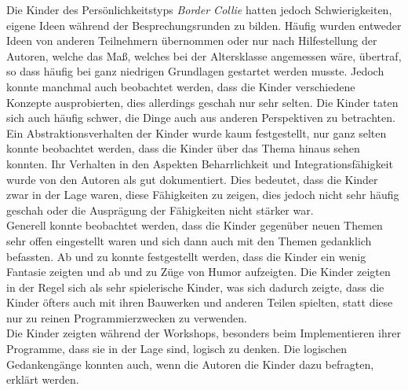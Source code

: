 Die Kinder des Persönlichkeitstyps \textit{Border Collie} hatten jedoch Schwierigkeiten, eigene Ideen während der Besprechungsrunden zu bilden. Häufig wurden entweder Ideen von anderen Teilnehmern übernommen oder nur nach Hilfestellung der Autoren, welche das Maß, welches bei der Altersklasse angemessen wäre, übertraf, so dass häufig bei ganz niedrigen Grundlagen gestartet werden musste. Jedoch konnte manchmal auch beobachtet werden, dass die Kinder verschiedene Konzepte ausprobierten, dies allerdings geschah nur sehr selten. Die Kinder taten sich auch häufig schwer, die Dinge auch aus anderen Perspektiven zu betrachten.\\
Ein Abstraktionsverhalten der Kinder wurde kaum festgestellt, nur ganz selten konnte beobachtet werden, dass die Kinder über das Thema hinaus sehen konnten. Ihr Verhalten in den Aspekten Beharrlichkeit und Integrationsfähigkeit wurde von den Autoren als gut dokumentiert. Dies bedeutet, dass die Kinder zwar in der Lage waren, diese Fähigkeiten zu zeigen, dies jedoch nicht sehr häufig geschah oder die Ausprägung der Fähigkeiten nicht stärker war.\\
Generell konnte beobachtet werden, dass die Kinder gegenüber neuen Themen sehr offen eingestellt waren und sich dann auch mit den Themen gedanklich befassten. Ab und zu konnte festgestellt werden, dass die Kinder ein wenig Fantasie zeigten und ab und zu Züge von Humor aufzeigten. Die Kinder zeigten in der Regel sich als sehr spielerische Kinder, was sich dadurch zeigte, dass die Kinder öfters auch mit ihren Bauwerken und anderen Teilen spielten, statt diese nur zu reinen Programmierzwecken zu verwenden.\\
Die Kinder zeigten während der Workshops, besonders beim Implementieren ihrer Programme, dass sie in der Lage sind, logisch zu denken. Die logischen Gedankengänge konnten auch, wenn die Autoren die Kinder dazu befragten, erklärt werden.


